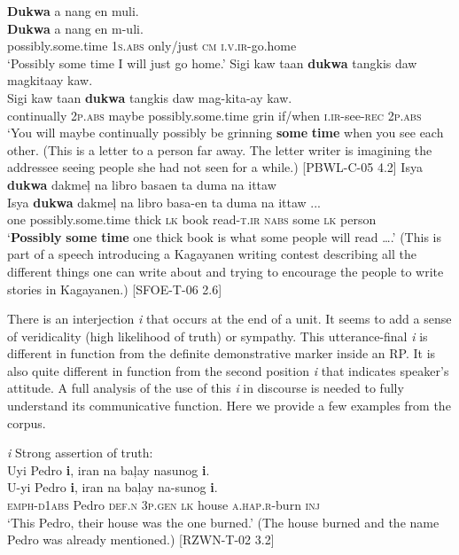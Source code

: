 \ea 
\label{bkm:Ref118730750}\label{bkm:Ref480870985}
\textbf{Dukwa}  a  nang  en  muli. \\\smallskip
\gll
\textbf{Dukwa}  a  nang  en  m-uli. \\
possibly.some.time  1\textsc{s.abs}  only/just  \textsc{cm}  \textsc{i.v.ir}-go.home \\
\glt ‘Possibly some time I will just go home.’
\z
\ea
Sigi  kaw  taan  \textbf{dukwa}  tangkis  daw  magkitaay  kaw. \\\smallskip
\gll Sigi  kaw  taan  \textbf{dukwa}  tangkis  daw  mag-kita-ay  kaw. \\
continually  2\textsc{p.abs}  maybe  possibly.some.time  grin  if/when  \textsc{i.ir}-see-\textsc{rec}    2\textsc{p.abs} \\
\glt ‘You will maybe continually possibly be grinning \textbf{some} \textbf{time} when you see each other. (This is a letter to a person far away. The letter writer is imagining the addressee seeing people she had not seen for a while.) [PBWL-C-05 4.2]
\z
\ea
\label{bkm:Ref118730755}
Isya  \textbf{dukwa}  dakmeļ  na  libro  basaen  ta  duma  na  ittaw \\\smallskip
\gll Isya  \textbf{dukwa}  dakmeļ  na  libro  basa-en  ta  duma  na  {ittaw ...} \\
one  possibly.some.time  thick  \textsc{lk}  book  read-\textsc{t.ir}  \textsc{nabs}  some  \textsc{lk}  person {}\\
\glt ‘\textbf{Possibly} \textbf{some} \textbf{time} one thick book is what some people will read ….’ (This is part of a speech introducing a Kagayanen writing contest describing all the different things one can write about and trying to encourage the people to write stories in Kagayanen.) [SFOE-T-06 2.6]
\z

There is an interjection \textit{i} that occurs at the end of a unit. It seems to add a sense of veridicality (high likelihood of truth) or sympathy. This utterance-final \textit{i} is different in function from the definite demonstrative marker inside an RP. It is also quite different in function from the second position \textit{i} that indicates speaker's attitude. A full analysis of the use of this \textit{i} in discourse is needed to fully understand its communicative function. Here we provide a few examples from the corpus.

\ea 
\label{bkm:Ref118731059}
\textit{i} Strong assertion of truth: \\
Uyi  Pedro  \textbf{i},  iran  na  baļay  nasunog  \textbf{i}. \\\smallskip
\gll U-yi  Pedro  \textbf{i},  iran  na  baļay  na-sunog  \textbf{i}. \\
\textsc{emph-d1abs}  Pedro  \textsc{def.n}  3\textsc{p.gen}  \textsc{lk}  house  \textsc{a.hap.r}-burn  \textsc{inj} \\
\glt ‘This Pedro, their house was the one burned.’ (The house burned and the name Pedro was already mentioned.) [RZWN-T-02 3.2]
\z


